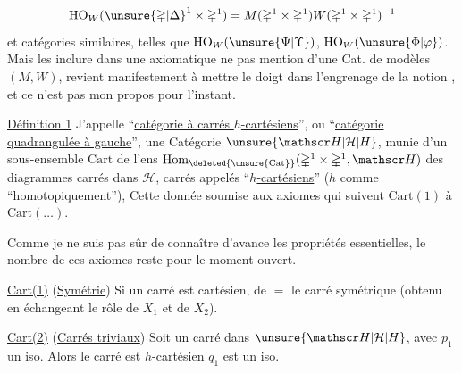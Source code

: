 \[
\mathrm{HO}_W(\unsure{\mathbb{\Delta}|\Delta}^1\times\mathbb{\Delta}^1)=M(\mathbb{\Delta}^1\times\mathbb{\Delta}^1)W(\mathbb{\Delta}^1\times\mathbb{\Delta}^1)^{-1}
\]
 et catégories similaires, telles que $\mathrm{HO}_W(\unsure{\Psi|\Upsilon})$, $\mathrm{HO}_W(\unsure{\Phi|\varphi})$. Mais les inclure dans une axiomatique ne  pas mention d'une Cat. de modèles $(M,W)$, revient manifestement à mettre le doigt dans l'engrenage de la notion  , et ce n'est pas mon propos pour l'instant.

\uline{Définition 1} J'appelle ``\uline{catégorie à carrés $h$-cartésiens}'', ou ``\uline{catégorie quadrangulée à gauche}'', une Catégorie $\unsure{\mathscr H|\mathcal H|H}$, munie d'un sous-ensemble $\mathrm{Cart}$ de l'ens $\mathrm{Hom}_{\deleted{\unsure{\mathrm{Cat}}}}(\mathbb{\Delta}^1\times\mathbb{\Delta}^1,\mathscr H)$ des diagrammes carrés
dans $\mathscr H$, carrés appelés ``\uline{$h$-cartésiens}'' ($h$ comme ``homotopiquement''), Cette
donnée   soumise aux axiomes qui suivent $\mathrm{Cart}(1)$ à $\mathrm{Cart}(\ldots)$.

Comme je ne suis pas sûr de connaître d'avance  les propriétés essentielles, le nombre de ces axiomes reste pour le moment ouvert.

\uline{Cart(1)} (\uline{Symétrie}) Si un carré
est cartésien, de $=$ le carré symétrique (obtenu en échangeant le rôle de $X_1$ et de $X_2$).

\uline{Cart(2)} (\uline{Carrés triviaux}) Soit
un carré dans $\unsure{\mathscr H|\mathcal H|H}$, avec $p_1$ un iso. Alors le carré est $h$-cartésien  $q_1$ est un iso.


